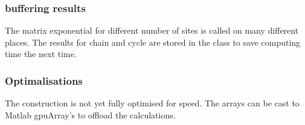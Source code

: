 \subsubsection{buffering results}

The matrix exponential for different number of sites is called on many different places. The results for chain and cycle are stored in the class to save computing time the next time.

\subsubsection{Optimalisations}
The construction is not yet fully optimised for speed. The arrays can be cast to Matlab gpuArray's to offload the calculations.